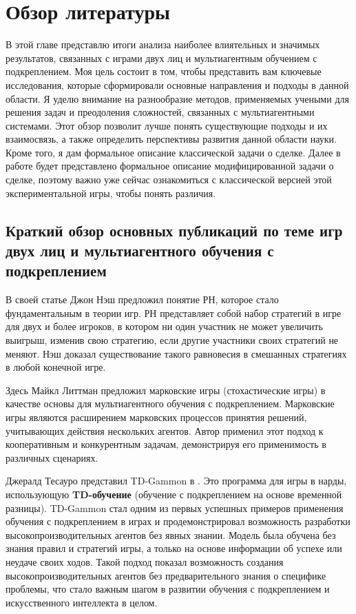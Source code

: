 \chapter{Обзор литературы}
\label{sec:Chapter1} 


В этой главе представлю итоги анализа наиболее влиятельных и значимых результатов, связанных с играми двух лиц и мультиагентным обучением с подкреплением. Моя цель состоит в том, чтобы представить вам ключевые исследования, которые сформировали основные направления и подходы в данной области. Я уделю внимание на разнообразие методов, применяемых учеными для решения задач и преодоления сложностей, связанных с мультиагентными системами. Этот обзор позволит лучше понять существующие подходы и их взаимосвязь, а также определить перспективы развития данной области науки. Кроме того, я дам формальное описание классической задачи о сделке. Далее в работе будет представлено формальное описание модифицированной задачи о сделке, поэтому важно уже сейчас ознакомиться с классической версией этой экспериментальной игры, чтобы понять различия.


\section{Краткий обзор основных публикаций по теме игр двух лиц и мультиагентного обучения с подкреплением}

В своей статье \cite{nash50} Джон Нэш предложил понятие РН, которое стало фундаментальным в теории игр. РН представляет собой набор стратегий в игре для двух и более игроков, в котором ни один участник не может увеличить выигрыш, изменив свою стратегию, если другие участники своих стратегий не меняют. Нэш доказал существование такого равновесия в смешанных стратегиях в любой конечной игре.

Здесь \cite{littman94} Майкл Литтман предложил марковские игры (стохастические игры) в качестве основы для мультиагентного обучения с подкреплением. Марковские игры являются расширением марковских процессов принятия решений, учитывающих действия нескольких агентов. Автор применил этот подход к кооперативным и конкурентным задачам, демонстрируя его применимость в различных сценариях.

Джералд Тесауро представил TD-Gammon в \cite{tesauro95}. Это программа для игры в нарды, использующую \textbf{TD-обучение} (обучение с подкреплением на основе временной разницы). TD-Gammon стал одним из первых успешных примеров применения обучения с подкреплением в играх и продемонстрировал возможность разработки высокопроизводительных агентов без явных знании. Модель была обучена без знания правил и стратегий игры, а только на основе информации об успехе или неудаче своих ходов. Такой подход показал возможность создания высокопроизводительных агентов без предварительного знания о специфике проблемы, что стало важным шагом в развитии обучения с подкреплением и искусственного интеллекта в целом.

